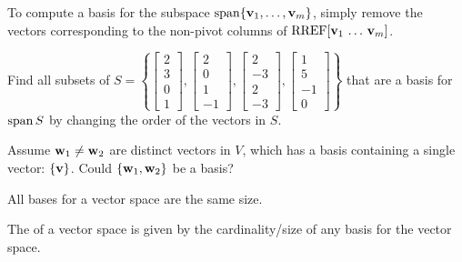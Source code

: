 


\begin{applicationActivities}{3}{14}

\begin{fact}
  To compute a basis for the subspace \(\operatorname{span}\{\mathbf v_1,\dots,\mathbf v_m\}\),
  simply remove the vectors corresponding to the non-pivot columns of
  \(\operatorname{RREF}[\mathbf v_1\,\dots\,\mathbf v_m]\).
\end{fact}

\begin{activity}{10}
  Find all subsets of \(S=\left\{
  \begin{bmatrix}2\\3\\0\\1\end{bmatrix},
  \begin{bmatrix}2\\0\\1\\-1\end{bmatrix},
  \begin{bmatrix}2\\-3\\2\\-3\end{bmatrix},
  \begin{bmatrix}1\\5\\-1\\0\end{bmatrix}
  \right\}
  \) that are a basis for \(\operatorname{span} S\) by changing the order
  of the vectors in \(S\).
\end{activity}

\begin{activity}{10}
  Assume \(\mathbf w_1\not=\mathbf w_2\) are distinct vectors in \(V\),
  which has a basis containing a single vector: \(\{\mathbf v\}\).
  Could \(\{\mathbf w_1,\mathbf w_2\}\) be a basis?
\end{activity}

\begin{fact}
  All bases for a vector space are the same size.
\end{fact}

\begin{definition}
  The  of a vector space is given by the cardinality/size
  of any basis for the vector space.
\end{definition}


\end{applicationActivities}
